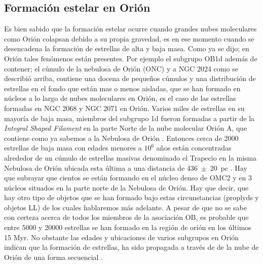 \subsection{Formación estelar en Orión}
\label{sec:frormacion}

Es bien sabido que la formación estelar ocurre cuando grandes nubes moleculares como Orión colapsan debido a su propia gravedad, es en ese momento cuando se desencadena la formación de estrellas de alta y baja masa. Como ya se dijo; en Orión tales fenómenos están presentes. Por ejemplo el subgrupo OB1d además de contener; el cúmulo de la nebulosa de Orión (ONC) y a NGC 2024 como se describió arriba, contiene  una docena de pequeños cúmulos y una distribución de estrellas en el fondo que están mas o menos aisladas, que se han formado en núcleos a lo largo de nubes moleculares en Orión, es el caso de las estrellas formadas en NGC 2068 y NGC 2071 en Orión. Varios miles de estrellas en su mayoría de baja masa, miembros del subgrupo 1d fueron formadas a partir de la \textit{Integral Shaped Filament} \citep{Bally:1987} en la parte Norte de la nube molecular Orión A, que contiene como ya sabemos a la Nebulosa de Orión \citep{Johnstone:1999}. Entonces cerca de 2000 estrellas de baja masa con edades menores a \(10^6\) años están concentradas alrededor de un cúmulo de estrellas masivas denominado el Trapecio en la misma Nebulosa de Orión \citep{Hillenbrand:1997} ubicada esta última a una distancia de 436~\(\pm\)~20~pc \citep{Odell:2008a}. Hay que subrayar que  cientos se están formando en el núcleo denso de OMC2 y en 3 núcleos situados en la parte norte de la Nebulosa de Orión. Hay que decir, que hay otro tipo de objetos que se han formado bajo estas circunstancias (proplyds y objetos LL) de los cuales hablaremos más adelante. A pesar de que no se sabe con certeza acerca de todos los miembros de la asociación OB, es probable que entre 5000 y 20000 estrellas se han formado en la región de orión en los últimos 15 Myr. No obstante las edades y ubicaciones de varios subgrupos en Orión indican que la formación de estrellas, ha sido propagada a través de de la nube de Orión de una forma secuencial \citep{Bally:2008a}. \\  
 
